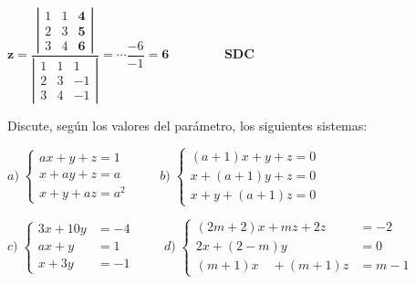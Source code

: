 \begin{proofw}
\noindent $\boldsymbol{z}=\dfrac {\left| \begin{matrix} 1&1&\boldsymbol{4}\\2&3&\boldsymbol{5}\\3&4&\boldsymbol{6} \end{matrix} \right|}  {\left| \begin{matrix} 1&1&1\\2&3&-1\\3&4&-1 \end{matrix} \right|} = \cdots \dfrac {-6}{-1}=\boldsymbol{6}\qquad \qquad$ \textbf{SDC}
	
\end{proofw}


\begin{ejre}
	Discute, según los valores del parámetro, los siguientes sistemas:
	
	$a)\;  \begin{cases}   ax+y+z=1\\x+ay+z=a\\x+y+az=a^2       \end{cases}\; \qquad
	 b)\;  \begin{cases}   (a+1)x+y+z=0\\x+(a+1)y+z=0\\x+y+(a+1)z=0       \end{cases}$
	 
	 $c)\;  \begin{cases}    3x+10y&=-4\\ax+y&=1\\x+3y&=-1      \end{cases}\; \qquad
	 d)\;  \begin{cases}    (2m+2)x+mz+2z&=-2\\ 2x+(2-m)y&=0\\(m+1)x \quad +(m+1)z&=m-1      \end{cases}$
	 
	 
\end{ejre}


